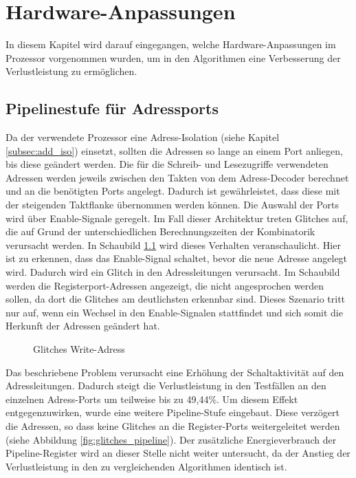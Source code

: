 \chapter{Hardware-Anpassungen}
In diesem Kapitel wird darauf eingegangen, welche Hardware-Anpassungen im Prozessor vorgenommen wurden, um in den Algorithmen eine Verbesserung der Verlustleistung zu ermöglichen.
\section{Pipelinestufe für Adressports}
Da der verwendete Prozessor eine Adress-Isolation (siehe Kapitel \ref{subsec:add_iso}) einsetzt, sollten die Adressen so lange an einem Port anliegen, bis diese geändert werden.
Die für die Schreib- und Lesezugriffe verwendeten Adressen werden jeweils zwischen den Takten von dem Adress-Decoder berechnet und an die benötigten Ports angelegt. Dadurch ist gewährleistet, dass diese mit der steigenden Taktflanke übernommen werden können. Die Auswahl der Ports wird über Enable-Signale geregelt. Im Fall dieser Architektur treten Glitches auf, die auf Grund der unterschiedlichen Berechnungszeiten der Kombinatorik verursacht werden. In Schaubild \ref{fig:glitches} wird dieses Verhalten veranschaulicht. Hier ist zu erkennen, dass das Enable-Signal schaltet, bevor die neue Adresse angelegt wird. Dadurch wird ein Glitch in den Adressleitungen verursacht. Im Schaubild werden die Registerport-Adressen angezeigt, die nicht angesprochen werden sollen, da dort die Glitches am deutlichsten erkennbar sind. Dieses Szenario tritt nur auf, wenn ein Wechsel in den Enable-Signalen stattfindet und sich somit die Herkunft der Adressen geändert hat.

\begin{figure}[H] 
	\centering
	
	\caption{Glitches Write-Adress}
	\label{fig:glitches}
\end{figure}


Das beschriebene Problem verursacht eine Erhöhung der Schaltaktivität auf den Adressleitungen. Dadurch steigt die Verlustleistung in den Testfällen an den einzelnen Adress-Ports um teilweise bis zu 49,44\%.
Um diesem Effekt entgegenzuwirken, wurde eine weitere Pipeline-Stufe eingebaut. Diese verzögert die Adressen, so dass keine Glitches an die Register-Ports weitergeleitet werden (siehe Abbildung \ref{fig:glitches_pipeline}). Der zusätzliche Energieverbrauch der Pipeline-Register wird an dieser Stelle nicht weiter untersucht, da der Anstieg der Verlustleistung in den zu vergleichenden Algorithmen identisch ist.

